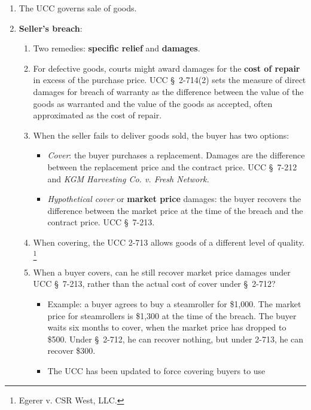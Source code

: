 \begin{enumerate}
\begin{enumerate}
        \item The UCC governs sale of goods.
        \item \textbf{Seller's breach}:
        \begin{enumerate}
            \item Two remedies: \textbf{specific relief} and \textbf{damages}.
            \item For defective goods, courts might award damages for the 
            \textbf{cost of repair} in excess of the purchase price.  UCC \S\ 
            2-714(2) sets the measure of direct damages for breach of warranty 
            as the difference between the value of the goods as warranted and 
            the value of the goods as accepted, often approximated as the cost 
            of repair.
            \item When the seller fails to deliver goods sold, the buyer has 
            two options:
            \begin{itemize}
                \item \emph{Cover}: the buyer purchases a replacement. Damages 
                are the difference between the replacement price and the 
                contract price. UCC \S\ 7-212 and \emph{KGM Harvesting Co. v. 
                Fresh Network.}
                \item \emph{Hypothetical cover} or \textbf{market price} 
                damages: the buyer recovers the difference between the market 
                price at the time of the breach and the contract price. UCC 
                \S\ 7-213.
            \end{itemize}
            \item When covering, the UCC 2-713 allows goods of a different 
            level of quality. \footnote{Egerer v. CSR West, LLC.}
            \item When a buyer covers, can he still recover market price 
            damages under UCC \S\ 7-213, rather than the actual cost of cover 
            under \S\ 2-712?
            \begin{itemize}
                \item Example: a buyer agrees to buy a steamroller for 
                \$1,000. The market price for steamrollers is \$1,300 at the 
                time of the breach. The buyer waits six months to cover, when 
                the market price has dropped to \$500. Under \S\ 2-712, he can 
                recover nothing, but under 2-713, he can recover \$300.
                \item The UCC has been updated to force covering buyers to use 

\end{itemize}
\end{enumerate}
\end{enumerate}
\end{enumerate}
